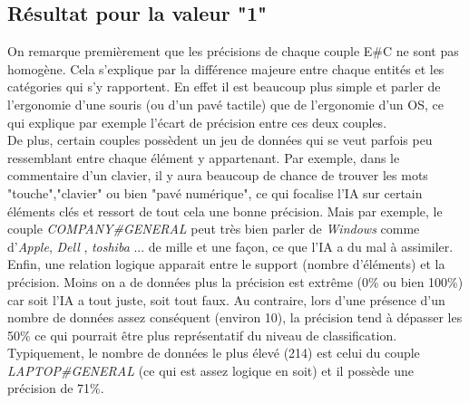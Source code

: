 \documentclass[12pt ,a4paper ]{article}
\begin{document}
\begin{multicols}{2}
\subsection{Résultat pour la valeur "1"}
On remarque premièrement que les précisions de chaque couple E\#C ne sont pas homogène. Cela s'explique par la différence majeure entre chaque entités et les catégories qui s'y rapportent. En effet il est beaucoup plus simple et parler de l'ergonomie d'une souris (ou d'un pavé tactile) que de l'ergonomie d'un OS, ce qui explique par exemple l'écart de précision entre ces deux couples. \\

De plus, certain couples possèdent un jeu de données qui se veut parfois peu ressemblant entre chaque élément y appartenant. Par exemple, dans le commentaire d'un clavier, il y aura beaucoup de chance de trouver les mots "touche","clavier" ou bien "pavé numérique", ce qui focalise l'IA sur certain éléments clés et ressort de tout cela une bonne précision. Mais par exemple, le couple \textit{COMPANY\#GENERAL} peut très bien parler de \textit{Windows} comme d'\textit{Apple}, \textit{Dell} , \textit{toshiba} ... de mille et une façon, ce que l'IA a du mal à assimiler. \\

Enfin, une relation logique apparait entre le support (nombre d'éléments) et la précision. Moins on a de données plus la précision est extrême (0\% ou bien 100\%) car soit l'IA a tout juste, soit tout faux. Au contraire, lors d'une présence d'un nombre de données assez conséquent (environ 10), la précision tend à dépasser les 50\% ce qui pourrait être plus représentatif du niveau de classification. Typiquement, le nombre de données le plus élevé (214) est celui du couple \textit{LAPTOP\#GENERAL} (ce qui est assez logique en soit) et il possède une précision de 71\%.


\end{multicols}
\end{document}
